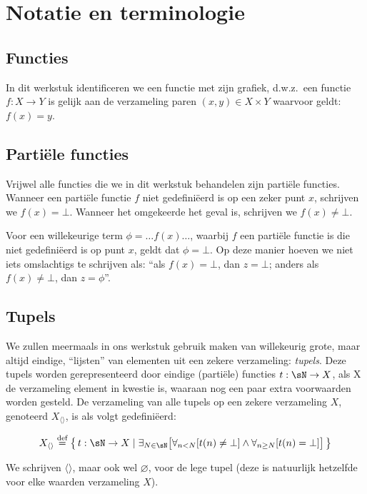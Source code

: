 
\chapter{Notatie en terminologie}

\section{Functies}

In dit werkstuk identificeren we een functie met zijn grafiek, d.w.z.~een functie $f : X \to Y$ is gelijk aan de verzameling paren $(x, y) \in X \times Y$ waarvoor geldt: $f(x) = y$.

\section{Partiële functies}

Vrijwel alle functies die we in dit werkstuk behandelen zijn partiële functies. Wanneer een partiële functie $f$ niet gedefiniëerd is op een zeker punt $x$, schrijven we $f(x) = \bot$. Wanneer het omgekeerde het geval is, schrijven we $f(x) \neq \bot$.

Voor een willekeurige term $\phi = \dots f(x)\dots$, waarbij $f$ een partiële functie is die niet gedefiniëerd is op punt $x$, geldt dat $\phi = \bot$. Op deze manier hoeven we niet iets omslachtigs te schrijven als: ``als $f(x) = \bot$, dan $z = \bot$; anders als $f(x) \neq \bot$, dan $z = \phi$''.

\section{Tupels}

We zullen meermaals in ons werkstuk gebruik maken van willekeurig grote, maar altijd eindige, ``lijsten'' van elementen uit een zekere verzameling: \emph{tupels}. Deze tupels worden gerepresenteerd door eindige (partiële) functies $t : \sN \to X$, als X de verzameling element in kwestie is, waaraan nog een paar extra voorwaarden worden gesteld. De verzameling van alle tupels op een zekere verzameling $X$, genoteerd $X_{\langle\rangle}$, is als volgt gedefiniëerd:

$$ X_{\langle\rangle} \DEF \big\{\, t : \sN \to X \mid \exists_{N \in \sN} \big[ \forall_{n < N}[t(n) \neq \bot] \land \forall_{n\ge N}[t(n) = \bot] \big] \,\big\} $$

We schrijven $\langle\rangle$, maar ook wel $\varnothing$, voor de lege tupel (deze is natuurlijk hetzelfde voor elke waarden verzameling $X$).

